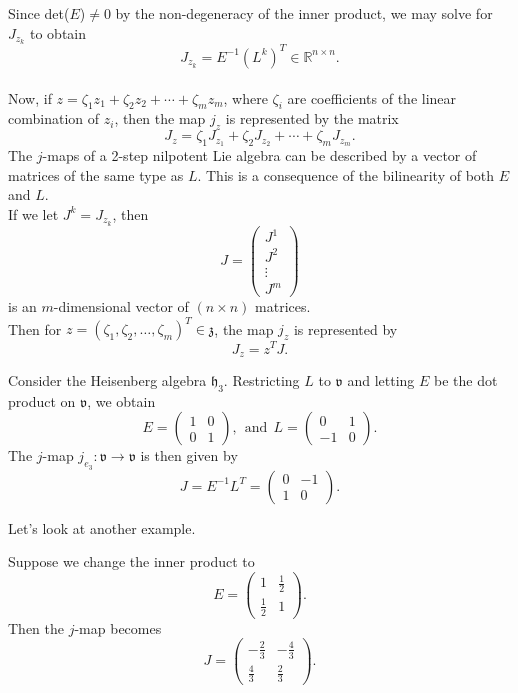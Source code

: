 \documentclass[11 pt]{article}
\newcommand{\R}{\mathbb{R}}
\newcommand{\fz}{\mathfrak{z}}
\newcommand{\fv}{\mathfrak{v}}
\newcommand{\fh}{\mathfrak{h}}
\begin{document}
    Since det($E$)$\neq 0$ by the non-degeneracy of the inner product, we may
    solve for $J_{z_k}$ to obtain
    \\
    $$
    J_{z_k} = E^{-1}(L^k)^T \in \R^{n \times n}.
    $$
    \\
    Now, if $z = \zeta_1z_1 + \zeta_2z_2 + \cdots + \zeta_mz_m$, where $\zeta_i$
    are coefficients of the linear combination of $z_i$, then the map $j_z$
    is represented by the matrix
    \\
    $$
    J_z = \zeta_1J_{z_1} + \zeta_2J_{z_2} + \cdots + \zeta_mJ_{z_m}.
    $$
    The $j$-maps of a 2-step nilpotent Lie algebra can be described by a vector
    of matrices of the same type as $L$.  This is a consequence of the
    bilinearity of both $E$ and $L$.
    \\

    If we let $J^k = J_{z_k}$, then
    $$
    J = \begin{pmatrix}
        J^1 \\ J^2 \\ \vdots \\ J^m
    \end{pmatrix}
    $$
    is an $m$-dimensional vector of $(n \times n)$ matrices.
    \\
    Then for $z = (\zeta_1,\zeta_2,\hdots,\zeta_m)^T \in \fz$, the map $j_z$
    is represented by
    \\
    $$
    J_z = z^TJ.
    $$
    \begin{example}
        Consider the Heisenberg algebra $\fh_3$. Restricting $L$ to
        $\fv$ and
        letting $E$ be the dot product on $\fv$, we obtain
        $$
        E = \begin{pmatrix}
            1 & 0 \\ 0 & 1
        \end{pmatrix},\ \ \text{and}\ \ L = \begin{pmatrix}
            0 & 1 \\ -1 & 0
        \end{pmatrix}.
        $$
        The $j$-map $j_{e_3} :\fv \to \fv$ is then given by
        $$
        J = E^{-1}L^T = \begin{pmatrix}
            0 & -1 \\ 1 & 0
        \end{pmatrix}.
        $$
    \end{example}
    Let's look at another example.

    \begin{example}
        Suppose we change the inner product to
        $$
        E = \begin{pmatrix}
            1 & \frac{1}{2} \\[0.5 ex] \frac{1}{2} & 1
        \end{pmatrix}.
        $$
        Then the $j$-map becomes
        $$
        J = \begin{pmatrix}
            -\frac{2}{3} & -\frac{4}{3} \\[0.5 ex] \frac{4}{3} & \frac{2}{3}
        \end{pmatrix}.
        $$
    \end{example}
\end{document}
